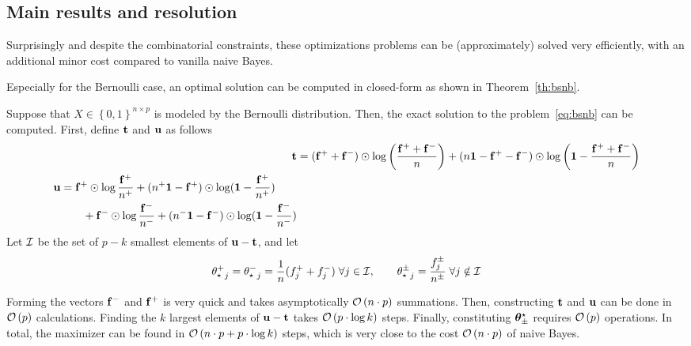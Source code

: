\subsection{Main results and resolution}\label{subsec:snb_th}

Surprisingly and despite the combinatorial constraints,
these optimizations problems can be (approximately) solved very efficiently,
with an additional minor cost compared to vanilla naive Bayes.

Especially for the Bernoulli case,
an optimal solution can be computed in closed-form as shown in Theorem~\ref{th:bsnb}.
\begin{theorem}\label{th:bsnb}
    Suppose that $X \in \left\{ 0, 1 \right\}^{n \times p}$ is modeled by the Bernoulli distribution.
    Then, the exact solution to the problem~\ref{eq:bsnb} can be computed.
    First, define $\mathbf{t}$ and $\mathbf{u}$ as follows
    \begin{align*}
        \mathbf{t} &= (\mathbf{f}^+ + \mathbf{f}^-) \odot \log\left( \frac{\mathbf{f}^+ + \mathbf{f}^-}{n} \right)
                + (n\mathbf{1} - \mathbf{f}^+ - \mathbf{f}^-) \odot \log\left( \mathbf{1} - \frac{\mathbf{f}^+ + \mathbf{f}^-}{n} \right)\\
        \begin{split}
                \mathbf{u} &= \mathbf{f}^+ \odot \log \frac{\mathbf{f}^+}{n^+} + (n^+\mathbf{1} - \mathbf{f}^+) \odot \log (\mathbf{1} - \frac{\mathbf{f}^+}{n^+})\\
                &\qquad + \mathbf{f}^- \odot \log \frac{\mathbf{f}^-}{n^-} + (n^-\mathbf{1} - \mathbf{f}^-) \odot \log (\mathbf{1} - \frac{\mathbf{f}^-}{n^-})
        \end{split}
    \end{align*}
    Let $\mathcal{I}$ be the set of $p - k$ smallest elements of $\mathbf{u} - \mathbf{t}$, and let
    \begin{equation*}
        {\theta^+_\star}_j = {\theta^-_\star}_j = \frac{1}{n}(f_j^+ + f_j^-)
        \;\forall j \in \mathcal{I}
        ,\qquad
        {\theta^\pm_\star}_j = \frac{f^\pm_j}{n^\pm}
        \;\forall j \notin \mathcal{I}
    \end{equation*}
\end{theorem}
Forming the vectors $\mathbf{f}^-$ and $\mathbf{f}^+$ is very quick
and takes asymptotically $\mathcal{O}\left( n \cdot p \right)$ summations.
Then, constructing $\mathbf{t}$ and $\mathbf{u}$ can be done in $\mathcal{O}\left( p \right)$ calculations.
Finding the $k$ largest elements of $\mathbf{u} - \mathbf{t}$ takes $\mathcal{O}\left( p \cdot \log k \right)$ steps.
Finally, constituting $\bm{\theta}_\pm^\star$ requires $\mathcal{O}\left( p \right)$ operations.
In total, the maximizer can be found in $\mathcal{O}\left( n \cdot p + p \cdot \log k \right)$ steps,
which is very close to the cost $\mathcal{O}\left( n \cdot p \right)$ of naive Bayes.

